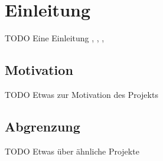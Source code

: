 \chapter{Einleitung}
TODO Eine Einleitung
\cite{DragsailRalfMA}
\cite{DragsailUweMAGroundDataHandling}, \cite{DragsailVolkerMACommstandard}, \cite{DragsailGeorgMAGroundSDR}, \cite{DragsailNeelamMAGroundDSP}

\section{Motivation}
TODO Etwas zur Motivation des Projekts

\section{Abgrenzung}
TODO Etwas über ähnliche Projekte 